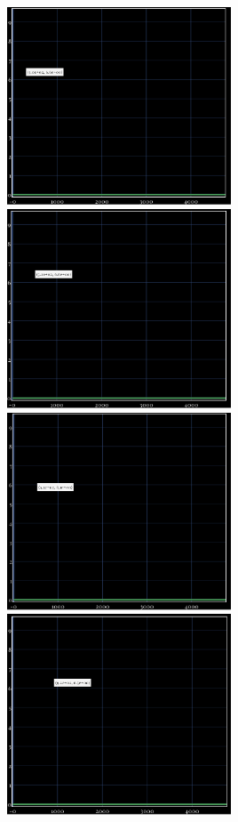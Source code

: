 \documentclass[times, utf8, diplomski]{diplomski}
\begin{document}
\noindent
\includegraphics[width=0.5\textwidth]{packets_lost_every_10ms.png}\hspace{0.05\textwidth}%
\includegraphics[width=0.5\textwidth]{packets_lost_every_9ms.png}\\[1em]
\includegraphics[width=0.5\textwidth]{packets_lost_every_8ms.png}\hspace{0.05\textwidth}%
\includegraphics[width=0.5\textwidth]{packets_lost_every_7ms.png}\\[1em]
\end{document}
